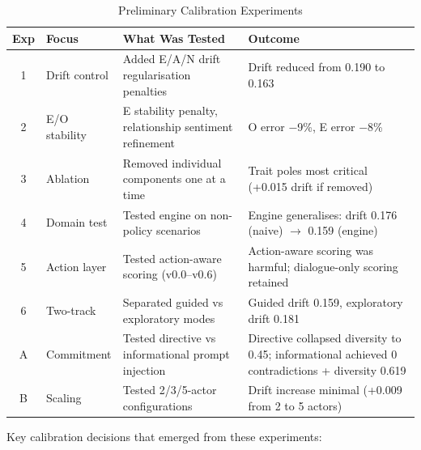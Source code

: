 \documentclass[12pt, a4paper]{report}
\begin{document}
\begin{table}[t]
\centering
\caption{Preliminary Calibration Experiments}
\label{tab:calibration}
\small
\begin{tabular}{clp{4.5cm}p{4.5cm}}
\toprule
Exp & Focus & What Was Tested & Outcome \\
\midrule
1 & Drift control & Added E/A/N drift regularisation penalties & Drift reduced from 0.190 to 0.163 \\
2 & E/O stability & E stability penalty, relationship sentiment refinement & O error $-$9\%, E error $-$8\% \\
3 & Ablation & Removed individual components one at a time & Trait poles most critical (+0.015 drift if removed) \\
4 & Domain test & Tested engine on non-policy scenarios & Engine generalises: drift 0.176 (naive) $\to$ 0.159 (engine) \\
5 & Action layer & Tested action-aware scoring (v0.0--v0.6) & Action-aware scoring was harmful; dialogue-only scoring retained \\
6 & Two-track & Separated guided vs exploratory modes & Guided drift 0.159, exploratory drift 0.181 \\
\midrule
A & Commitment & Tested directive vs informational prompt injection & Directive collapsed diversity to 0.45; informational achieved 0 contradictions + diversity 0.619 \\
B & Scaling & Tested 2/3/5-actor configurations & Drift increase minimal (+0.009 from 2 to 5 actors) \\
\bottomrule
\end{tabular}
\end{table}

Key calibration decisions that emerged from these experiments:
\end{document}

